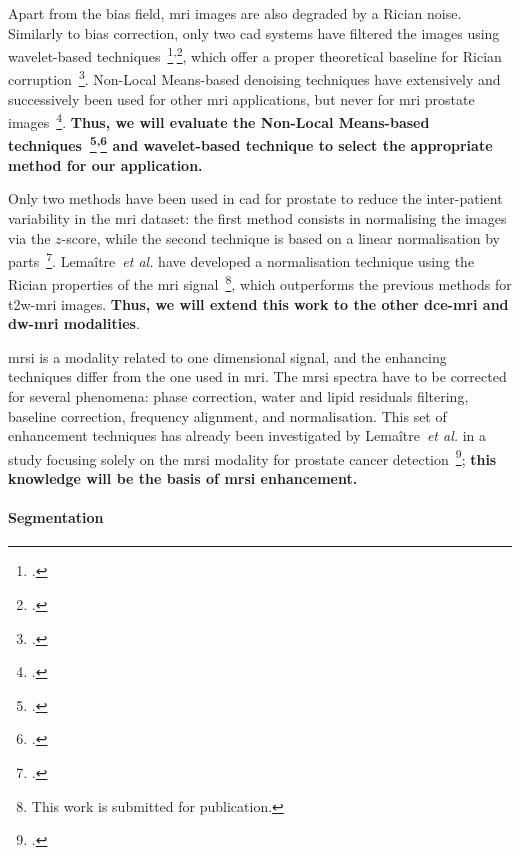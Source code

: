 Apart from the bias field, \Ac{mri} images are also degraded by a Rician noise. 
Similarly to bias correction, only two \ac{cad} systems have filtered the images using wavelet-based techniques~\footcite{Mallat2008}\textsuperscript{,}\footcite{Pizurica2003}, which offer a proper theoretical baseline for Rician corruption~\footcite{Nowak1999}.
Non-Local Means-based denoising techniques have extensively and successively been used for other \ac{mri} applications, but never for \ac{mri} prostate images~\footcite{Manjon2008}.
\textbf{Thus, we will evaluate the Non-Local Means-based techniques~\footcite{Manjon2012}\textsuperscript{,}\footcite{Coupe2011} and wavelet-based technique to select the appropriate method for our application.}

Only two methods have been used in \ac{cad} for prostate to reduce the inter-patient variability in the \ac{mri} dataset: the first method consists in normalising the images via the $z$-score, while the second technique is based on a linear normalisation by parts~\footcite{Madabhushi2006a}.
Lema\^itre~\emph{et al.} have developed a normalisation technique using the Rician properties of the \ac{mri} signal~\footnote{This work is submitted for publication.}, which outperforms the previous methods for \ac{t2w}-\ac{mri} images.
\textbf{Thus, we will extend this work to the other \ac{dce}-\ac{mri} and \ac{dw}-\ac{mri} modalities}.

\ac{mrsi} is a modality related to one dimensional signal, and the enhancing techniques differ from the one used in \ac{mri}.
The \ac{mrsi} spectra have to be corrected for several phenomena: phase correction, water and lipid residuals filtering, baseline correction, frequency alignment, and normalisation.
This set of enhancement techniques has already been investigated by Lema\^itre~\emph{et al.} in a study focusing solely on the \ac{mrsi} modality for prostate cancer detection~\footcite{Lemaitre2011}; \textbf{this knowledge will be the basis of \ac{mrsi} enhancement.}

\paragraph{Segmentation}

